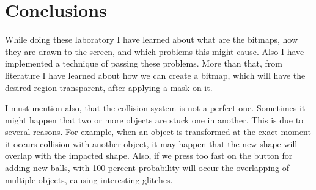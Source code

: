 \section*{Conclusions}

While doing these laboratory I have learned about what are the bitmaps, how they are drawn to the screen, and which problems this might cause. Also I have implemented a technique of passing these problems. More than that, from literature I have learned about how we can create a bitmap, which will have the desired region transparent, after applying a mask on it. 

I must mention also, that the collision system is not a perfect one. Sometimes it might happen that two or more objects are stuck one in another. This is due to several reasons. For example, when an object is transformed at the exact moment it occurs collision with another object, it may happen that the new shape will overlap with the impacted shape. Also, if we press too fast on the button for adding new balls, with 100 percent probability will occur the overlapping of multiple objects, causing interesting glitches. 

\clearpage